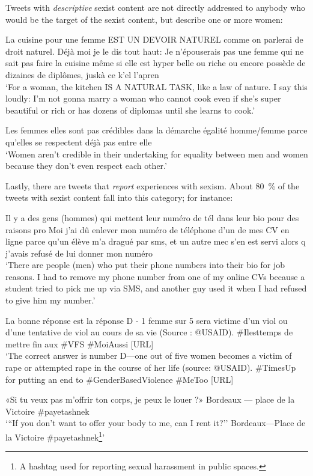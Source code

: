 Tweets with \textit{descriptive} sexist content are not directly addressed to anybody who would be the target of the sexist content, but describe one or more women:

\begin{exe}
\ex La cuisine pour une femme EST UN DEVOIR NATUREL comme on parlerai de droit naturel. Déjà moi je le dis tout haut: Je n'épouserais pas une femme qui ne sait pas faire la cuisine même si elle est hyper belle ou riche ou encore possède de dizaines de diplômes, juskà ce k'el l'apren\\
`For a woman, the kitchen IS A NATURAL TASK, like a law of nature. I say this loudly: I'm not gonna marry a woman who cannot cook even if she's super beautiful or rich or has dozens of diplomas until she learns to cook.'

\ex Les femmes elles sont pas crédibles dans la démarche égalité homme/femme parce qu’elles se respectent déjà pas entre elle\\
`Women aren't credible in their undertaking for equality between men and women because they don't even respect each other.'
\end{exe}

Lastly, there are tweets that \textit{report} experiences with sexism.
About 80~\% of the tweets with sexist content fall into this category; for instance:

\begin{exe}
\ex Il y a des gens (hommes) qui mettent leur numéro de tél dans leur bio pour des raisons pro Moi j'ai dû enlever mon numéro de téléphone d'un de mes CV en ligne parce qu'un élève m'a dragué par sms, et un autre mec s'en est servi alors q j'avais refusé de lui donner mon numéro\\
`There are people (men) who put their phone numbers into their bio for job reasons. I had to remove my phone number from one of my online CVs because a student tried to pick me up via SMS, and another guy used it when I had refused to give him my number.'

\ex La bonne réponse est la réponse D - 1 femme sur 5 sera victime d’un viol ou d’une tentative de viol au cours de sa vie (Source : @USAID). \#Ilesttemps de mettre fin aux \#VFS \#MoiAussi [URL]\\
`The correct answer is number D---one out of five women becomes a victim of rape or attempted rape in the course of her life (source: @USAID). \#TimesUp for putting an end to \#GenderBasedViolence \#MeToo [URL]

\ex «Si tu veux pas m'offrir ton corps, je peux le louer ?» Bordeaux — place de la Victoire \#payetashnek\\
`{``}If you don't want to offer your body to me, can I rent it?'' Bordeaux---Place de la Victoire \#payetashnek\footnote{A hashtag used for reporting sexual harassment in public spaces.}'
\end{exe}

